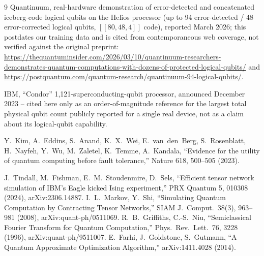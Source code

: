 \documentclass[9pt,twocolumn]{extarticle}
\begin{document}
\begin{thebibliography}{9}
 Quantinuum, real-hardware demonstration of
error-detected and concatenated iceberg-code logical qubits on the Helios
processor (up to 94 error-detected / 48 error-corrected logical qubits,
$[[80,48,4]]$ code), reported March 2026; this postdates our training data
and is cited from contemporaneous web coverage, not verified against the
original preprint: \url{https://thequantuminsider.com/2026/03/10/quantinuum-researchers-demonstrates-quantum-computations-with-dozens-of-protected-logical-qubits/}
and \url{https://postquantum.com/quantum-research/quantinuum-94-logical-qubits/}.

 IBM, ``Condor'' 1{,}121-superconducting-qubit
processor, announced December 2023 -- cited here only as an order-of-magnitude
reference for the largest total physical qubit count publicly reported for a
single real device, not as a claim about its logical-qubit capability.

 Y.~Kim, A.~Eddins, S.~Anand, K.~X.~Wei,
E.~van~den~Berg, S.~Rosenblatt, H.~Nayfeh, Y.~Wu, M.~Zaletel, K.~Temme,
A.~Kandala, ``Evidence for the utility of quantum computing before fault
tolerance,'' Nature 618, 500--505 (2023).

 J.~Tindall, M.~Fishman, E.~M.~Stoudenmire,
D.~Sels, ``Efficient tensor network simulation of IBM's Eagle kicked
Ising experiment,'' PRX Quantum 5, 010308 (2024), arXiv:2306.14887.
 I.~L.~Markov, Y.~Shi, ``Simulating Quantum
Computation by Contracting Tensor Networks,'' SIAM J.\ Comput.\ 38(3),
963--981 (2008), arXiv:quant-ph/0511069.
 R.~B.~Griffiths, C.-S.~Niu, ``Semiclassical
Fourier Transform for Quantum Computation,'' Phys.\ Rev.\ Lett.\ 76,
3228 (1996), arXiv:quant-ph/9511007.
 E.~Farhi, J.~Goldstone, S.~Gutmann, ``A Quantum
Approximate Optimization Algorithm,'' arXiv:1411.4028 (2014).
\end{thebibliography}
\end{document}
